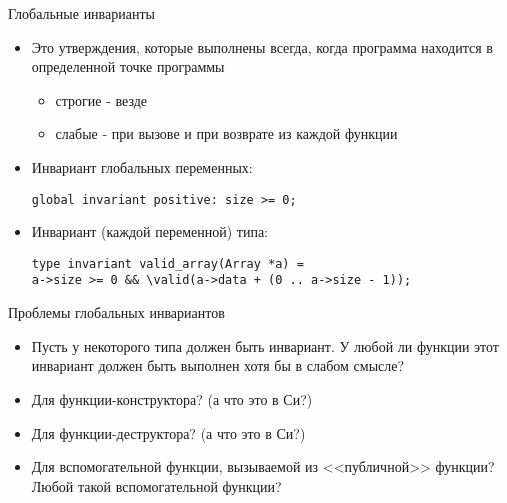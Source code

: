 \documentclass[hyperref={unicode=true}]{beamer}
\begin{document}
%

    \begin{frame}[fragile]{Глобальные инварианты}
    \begin{itemize}
    \item
    Это утверждения, которые выполнены всегда, когда
    программа находится в определенной точке программы
        \begin{itemize}
        \item строгие - везде
        \item слабые - при вызове и при возврате из
        каждой функции
        \end{itemize}
    \item Инвариант глобальных переменных:
    \begin{block}{}
    \verb|global invariant positive: size >= 0;|
    \end{block}
    \item Инвариант (каждой переменной) типа:
    \begin{block}{}
    \begin{verbatim}type invariant valid_array(Array *a) =
a->size >= 0 && \valid(a->data + (0 .. a->size - 1));\end{verbatim}
    \end{block}
    \end{itemize}
    \end{frame}

    \begin{frame}{Проблемы глобальных инвариантов}
    \begin{itemize}
    \item
    Пусть у некоторого типа должен быть инвариант.
    У любой ли функции этот инвариант должен быть
    выполнен хотя бы в слабом смысле?
    \item
    Для функции-конструктора? (а что это в Си?)
    \item
    Для функции-деструктора? (а что это в Си?)
    \item
    Для вспомогательной функции, вызываемой из
    <<публичной>> функции? Любой такой вспомогательной
    функции?
    \end{itemize}
    \end{frame}
\end{document}

